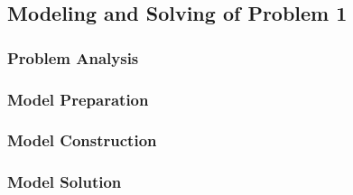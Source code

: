\subsection{Modeling and Solving of Problem 1}
\subsubsection{Problem Analysis}

\subsubsection{Model Preparation}

\subsubsection{Model Construction}

\subsubsection{Model Solution}


